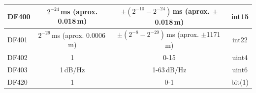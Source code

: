 \documentclass[a4paper,12pt,oneside,onecolumn,final,openright]{book}%
\begin{document}
\begin{table}[]
\begin{tabular}{|l|c|c|c|}
DF400                                                         & $2^{-24}$\,ms (aprox. 0.018\,m)  & $\pm(2^{-10}-2^{-24})$\,ms (aprox. $\pm$0.018\,m) & int15        \\ \hline
DF401                                                         & $2^{-29}$\,ms (aprox. 0.0006\,m) & $\pm(2^{-8}-2^{-29})$\,ms (aprox. $\pm$1171\,m)   & int22        \\ \hline
DF402                                                         & 1                                & 0-15                                              & uint4        \\ \hline
DF403                                                         & 1\,dB/Hz                         & 1-63\,dB/Hz                                       & uint6        \\ \hline
DF420                                                         & 1                                & 0-1                                               & bit(1)       \\ \hline
\end{tabular}
\end{table}
\end{document}
